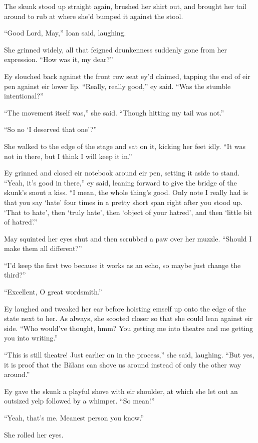 The skunk stood up straight again, brushed her shirt out, and brought her tail around to rub at where she'd bumped it against the stool.

``Good Lord, May,'' Ioan said, laughing.

She grinned widely, all that feigned drunkenness suddenly gone from her expression. ``How was it, my dear?''

Ey slouched back against the front row seat ey'd claimed, tapping the end of eir pen against eir lower lip. ``Really, really good,'' ey said. ``Was the stumble intentional?''

``The movement itself was,'' she said. ``Though hitting my tail was not.''

``So no `I deserved that one'?''

She walked to the edge of the stage and sat on it, kicking her feet idly. ``It was not in there, but I think I will keep it in.''

Ey grinned and closed eir notebook around eir pen, setting it aside to stand. ``Yeah, it's good in there,'' ey said, leaning forward to give the bridge of the skunk's snout a kiss. ``I mean, the whole thing's good. Only note I really had is that you say `hate' four times in a pretty short span right after you stood up. `That to hate', then `truly hate', then `object of your hatred', and then `little bit of hatred'.''

May squinted her eyes shut and then scrubbed a paw over her muzzle. ``Should I make them all different?''

``I'd keep the first two because it works as an echo, so maybe just change the third?''

``Excellent, O great wordsmith.''

Ey laughed and tweaked her ear before hoisting emself up onto the edge of the state next to her. As always, she scooted closer so that she could lean against eir side. ``Who would've thought, hmm? You getting me into theatre and me getting you into writing.''

``This is still theatre! Just earlier on in the process,'' she said, laughing. ``But yes, it is proof that the Bălans can shove us around instead of only the other way around.''

Ey gave the skunk a playful shove with eir shoulder, at which she let out an outsized yelp followed by a whimper. ``So mean!''

``Yeah, that's me. Meanest person you know.''

She rolled her eyes.

